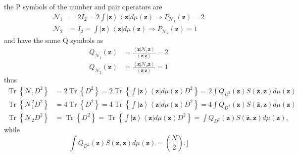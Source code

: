 \documentclass[aps,preprint]{revtex4}%
\begin{document}
the P symbols of the number and pair operators are
\begin{align}
\mathcal{N}_{1}  &  =2I_{2}=2\int\left\vert \mathbf{z}\right\rangle
\left\langle \mathbf{z}\right\vert d\mu\left(  \mathbf{z}\right)  \Rightarrow
P_{\mathcal{N}_{1}}\left(  \mathbf{z}\right)  =2\nonumber\\
\mathcal{N}_{2}  &  =I_{2}=\int\left\vert \mathbf{z}\right\rangle \left\langle
\mathbf{z}\right\vert d\mu\left(  \mathbf{z}\right)  \Rightarrow
P_{\mathcal{N}_{2}}\left(  \mathbf{z}\right)  =1
\end{align}
and have the same Q symbols as
\begin{align*}
Q_{\mathcal{N}_{1}}\left(  \mathbf{z}\right)   &  =\frac{\left\langle
\mathbf{z}\left\vert \mathcal{N}_{1}\mathbf{z}\right.  \right\rangle
}{\left\langle \mathbf{z}\left\vert \mathbf{z}\right.  \right\rangle }=2\\
Q_{\mathcal{N}_{2}}\left(  \mathbf{z}\right)   &  =\frac{\left\langle
\mathbf{z}\left\vert \mathcal{N}_{2}\mathbf{z}\right.  \right\rangle
}{\left\langle \mathbf{z}\left\vert \mathbf{z}\right.  \right\rangle }=1
\end{align*}
thus
\begin{align}
\operatorname*{Tr}\left\{  \mathcal{N}_{1}D^{2}\right\}   &
=2\operatorname*{Tr}\left\{  D^{2}\right\}  =2\operatorname*{Tr}\left\{
\int\left\vert \mathbf{z}\right\rangle \left\langle \mathbf{z}\right\vert
d\mu\left(  \mathbf{z}\right)  D^{2}\right\}  =2\int Q_{D^{2}}\left(
\mathbf{z}\right)  S\left(  \mathbf{\bar{z},z}\right)  d\mu\left(
\mathbf{z}\right) \nonumber\\
\operatorname*{Tr}\left\{  \mathcal{N}_{1}^{2}D^{2}\right\}   &
=4\operatorname*{Tr}\left\{  D^{2}\right\}  =4\operatorname*{Tr}\left\{
\int\left\vert \mathbf{z}\right\rangle \left\langle \mathbf{z}\right\vert
d\mu\left(  \mathbf{z}\right)  D^{2}\right\}  =4\int Q_{D^{2}}\left(
\mathbf{z}\right)  S\left(  \mathbf{\bar{z},z}\right)  d\mu\left(
\mathbf{z}\right) \nonumber\\
\operatorname*{Tr}\left\{  \mathcal{N}_{2}D^{2}\right\}   &
=\operatorname*{Tr}\left\{  D^{2}\right\}  =\operatorname*{Tr}\left\{
\int\left\vert \mathbf{z}\right\rangle \left\langle \mathbf{z}\right\vert
d\mu\left(  \mathbf{z}\right)  D^{2}\right\}  =\int Q_{D^{2}}\left(
\mathbf{z}\right)  S\left(  \mathbf{\bar{z},z}\right)  d\mu\left(
\mathbf{z}\right)  ,
\end{align}
while%
\begin{equation}
\int Q_{D^{2}}\left(  \mathbf{z}\right)  S\left(  \mathbf{\bar{z},z}\right)
d\mu\left(  \mathbf{z}\right)  =\binom{N}{2}.\rfloor
\end{equation}
\end{document}
